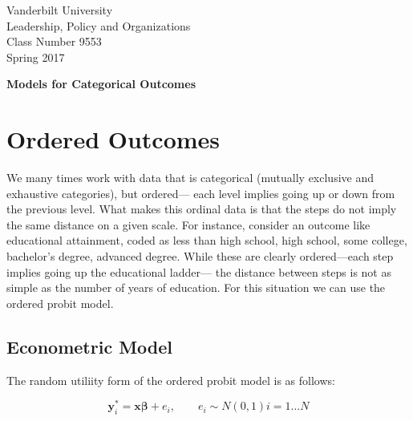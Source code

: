 \documentclass[12 pt]{article}
\begin{document}
\newcommand{\boldbeta}{\boldsymbol{\beta}}
\newcommand{\boldy}{\boldsymbol{y}}
\newcommand{\boldX}{\boldsymbol{X}}
\newcommand{\boldx}{\boldsymbol{x}}
\newcommand{\boldz}{\boldsymbol{z}}
\newcommand{\boldgamma}{\boldsymbol{\gamma}}
\newcommand{\boldeps}{\boldsymbol{\epsilon}}


\setlength{\parskip}{1ex plus 0.5ex minus 0.2ex}

\setcounter{secnumdepth}{-2}


\begin{flushleft}
  

Vanderbilt University \\
Leadership, Policy and Organizations \\
Class Number 9553 \\
Spring 2017 \\
\end{flushleft}

\begin{centering}
\textbf{\large{Models for Categorical Outcomes}}  
\end{centering}


\section{Ordered Outcomes}

We many times work with data that is categorical (mutually exclusive and exhaustive
categories), but ordered--- each level implies going up or down from the previous level.
What makes this ordinal data is that the steps do not imply the same distance on a
given scale. For instance, consider an outcome like educational attainment, coded as
less than high school, high school, some college, bachelor's degree, advanced degree.
While these are clearly ordered---each step implies going up the educational ladder---
the distance between steps is not as simple as the number of years of education.
For this situation we can use the ordered probit model. 


\subsection{Econometric Model}
\label{sec:econometric-model}

The random  utiliity form of the ordered probit model is as follows:

\begin{equation*}
  \boldy^*_i=\boldx \boldbeta + e_i, \qquad e_i  \sim N (0,1)   i=1  \ldots N
\end{equation*}
\end{document}

